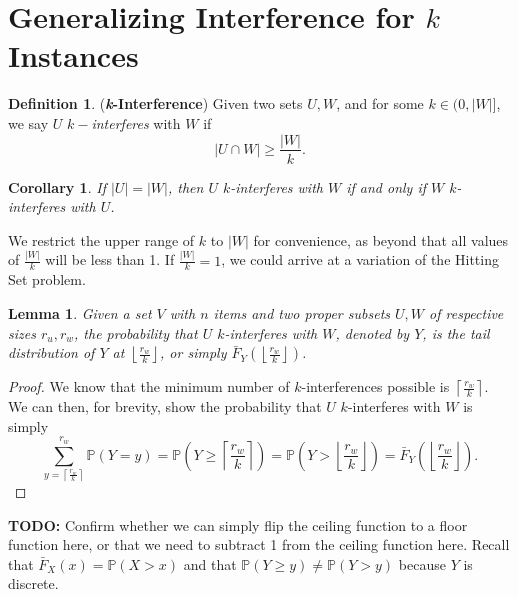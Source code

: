 \documentclass[10pt]{extarticle}
\newtheorem{lemma}[theorem]{Lemma}
\newtheorem{corollary}[theorem]{Corollary}
\theoremstyle{definition}
\newtheorem{definition}[theorem]{Definition}
\begin{document}
\section{Generalizing Interference for $k$ Instances}

\begin{definition}
    (\textbf{\textit{k}-Interference}) Given two sets $U, W$, and for some $k \in (0,|W|]$, we say $U$ $k-$\textit{interferes} with $W$ if 
    \begin{equation}
        |U \cap W| \ge  \frac{|W|}{k}.
    \end{equation}
\end{definition}

\begin{corollary}
\label{collorary:k-int-equals}
    If $|U| = |W|$, then $U$ $k$-interferes with $W$ if and only if $W$ $k$-interferes with $U$.
\end{corollary}

We restrict the upper range of $k$ to $|W|$ for convenience, as beyond that all values of $\frac{|W|}{k}$ will be less than 1. If $\frac{|W|}{k} = 1$, we could arrive at a variation of the Hitting Set problem. 


\begin{lemma}
\label{lemma:k-int-prob}
    Given a set $V$ with $n$ items and two proper subsets $U,W$ of respective sizes $r_u,r_w$, the probability that $U$ $k$-interferes with $W$, denoted by $Y$, is the tail distribution of $Y$ at $\left\lfloor \frac{r_w}{k} \right\rfloor$, or simply $\bar{F}_Y\left(\left\lfloor \frac{r_w}{k} \right\rfloor\right)$.
\end{lemma}
\begin{proof}
    We know that the minimum number of $k$-interferences possible is $\left\lceil \frac{r_w}{k} \right\rceil$. We can then, for brevity, show the probability that $U$ $k$-interferes with $W$ is simply
    \begin{equation}
        \sum_{y = \left\lceil \frac{r_w}{k} \right\rceil}^{r_w} \mathbb{P}(Y=y) = \mathbb{P}\left(Y \geq \left\lceil \frac{r_w}{k} \right\rceil\right) = \mathbb{P}\left(Y > \left\lfloor \frac{r_w}{k} \right\rfloor\right) = \bar{F}_Y\left(\left\lfloor \frac{r_w}{k} \right\rfloor\right).
    \end{equation}
\end{proof}

\textbf{TODO:} Confirm whether we can simply flip the ceiling function to a floor function here, or that we need to subtract 1 from the ceiling function here. Recall that $\bar{F}_{X}(x) = \mathbb{P}(X > x)$ and that $\mathbb{P}(Y \geq y) \neq \mathbb{P}(Y > y)$ because $Y$ is discrete. 
\end{document}
